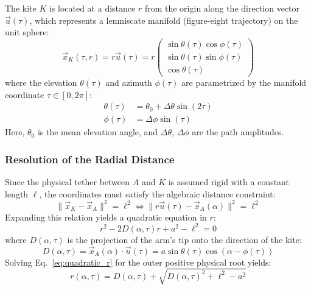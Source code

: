 \documentclass{article}
\begin{document}
The kite $K$ is located at a distance $r$ from the origin along the direction vector $\vec{u}(\tau)$, which represents a lemniscate manifold (figure-eight trajectory) on the unit sphere:
\begin{equation}
\vec{x}_K(\tau, r) = r \vec{u}(\tau) = r \begin{pmatrix} \sin\theta(\tau)\cos\phi(\tau) \\ \sin\theta(\tau)\sin\phi(\tau) \\ \cos\theta(\tau) \end{pmatrix}
\end{equation}
where the elevation $\theta(\tau)$ and azimuth $\phi(\tau)$ are parametrized by the manifold coordinate $\tau \in [0, 2\pi]$:
\begin{align}
\theta(\tau) &= \theta_0 + \Delta\theta \sin(2\tau) \\
\phi(\tau) &= \Delta\phi \sin(\tau)
\end{align}
Here, $\theta_0$ is the mean elevation angle, and $\Delta\theta$, $\Delta\phi$ are the path amplitudes.

\subsubsection{Resolution of the Radial Distance}
Since the physical tether between $A$ and $K$ is assumed rigid with a constant length $\ell$, the coordinates must satisfy the algebraic distance constraint:
\begin{equation}
\|\vec{x}_K - \vec{x}_A\|^2 = \ell^2 \iff \|r\vec{u}(\tau) - \vec{x}_A(\alpha)\|^2 = \ell^2
\end{equation}
Expanding this relation yields a quadratic equation in $r$:
\begin{equation}
r^2 - 2 D(\alpha, \tau) r + a^2 - \ell^2 = 0
\label{eq:quadratic_r}
\end{equation}
where $D(\alpha, \tau)$ is the projection of the arm's tip onto the direction of the kite:
\begin{equation}
D(\alpha, \tau) = \vec{x}_A(\alpha) \cdot \vec{u}(\tau) = a \sin\theta(\tau) \cos(\alpha - \phi(\tau))
\end{equation}
Solving Eq.~\eqref{eq:quadratic_r} for the outer positive physical root yields:
\begin{equation}
r(\alpha, \tau) = D(\alpha, \tau) + \sqrt{D(\alpha, \tau)^2 + \ell^2 - a^2}
\end{equation}
\end{document}
